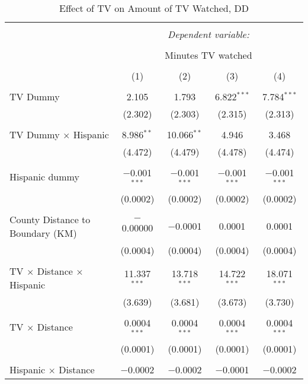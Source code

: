 
\begin{table}[!htbp] \centering 
  \caption{Effect of TV on Amount of TV Watched, DD} 
  \label{} 
\begin{tabular}{@{\extracolsep{-5pt}}lcccc} 
\\[-1.8ex]\hline 
\hline \\[-1.8ex] 
 & \multicolumn{4}{c}{\textit{Dependent variable:}} \\ 
\cline{2-5} 
\\[-1.8ex] & \multicolumn{4}{c}{Minutes TV watched} \\ 
\\[-1.8ex] & (1) & (2) & (3) & (4)\\ 
\hline \\[-1.8ex] 
 TV Dummy & 2.105 & 1.793 & 6.822$^{***}$ & 7.784$^{***}$ \\ 
  & (2.302) & (2.303) & (2.315) & (2.313) \\ 
  & & & & \\ 
 TV Dummy $\times$ Hispanic  & 8.986$^{**}$ & 10.066$^{**}$ & 4.946 & 3.468 \\ 
  & (4.472) & (4.479) & (4.478) & (4.474) \\ 
  & & & & \\ 
 Hispanic dummy & $-$0.001$^{***}$ & $-$0.001$^{***}$ & $-$0.001$^{***}$ & $-$0.001$^{***}$ \\ 
  & (0.0002) & (0.0002) & (0.0002) & (0.0002) \\ 
  & & & & \\ 
 County Distance to Boundary (KM) & $-$0.00000 & $-$0.0001 & 0.0001 & 0.0001 \\ 
  & (0.0004) & (0.0004) & (0.0004) & (0.0004) \\ 
  & & & & \\ 
 TV $\times$ Distance $\times$ Hispanic & 11.337$^{***}$ & 13.718$^{***}$ & 14.722$^{***}$ & 18.071$^{***}$ \\ 
  & (3.639) & (3.681) & (3.673) & (3.730) \\ 
  & & & & \\ 
 TV $\times$ Distance & 0.0004$^{***}$ & 0.0004$^{***}$ & 0.0004$^{***}$ & 0.0004$^{***}$ \\ 
  & (0.0001) & (0.0001) & (0.0001) & (0.0001) \\ 
  & & & & \\ 
 Hispanic $\times$ Distance & $-$0.0002 & $-$0.0002 & $-$0.0001 & $-$0.0002 \\ 

\end{tabular}
\end{table}
